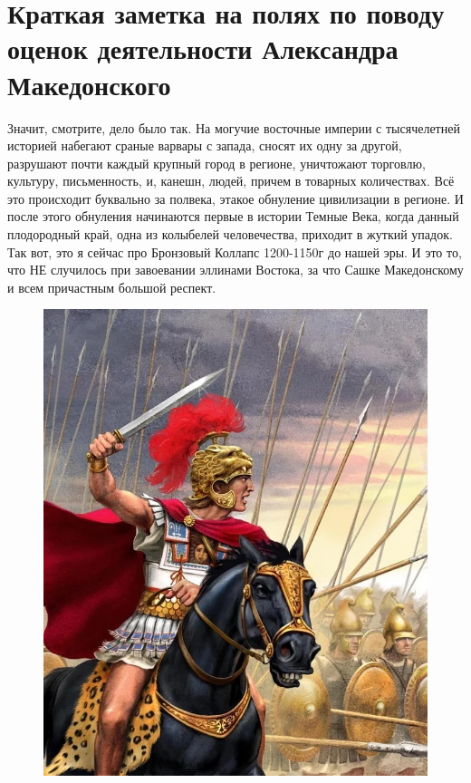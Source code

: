 \chapter{Краткая заметка на полях по поводу оценок деятельности Александра Македонского}


Значит, смотрите, дело было так. На могучие восточные империи с тысячелетней историей набегают сраные варвары с запада, сносят их одну за другой, разрушают почти каждый крупный город в регионе, уничтожают торговлю, культуру, письменность, и, канешн, людей, причем в товарных количествах. Всё это происходит буквально за полвека, этакое обнуление цивилизации в регионе. И после этого обнуления начинаются первые в истории Темные Века, когда данный плодородный край, одна из колыбелей человечества, приходит в жуткий упадок. Так вот, это я сейчас про Бронзовый Коллапс 1200-1150г до нашей эры. И это то, что НЕ случилось при завоевании эллинами Востока, за что Сашке Македонскому и всем причастным большой респект. 

\begin{figure}[h!tb] 
	\centering\includegraphics[scale=0.3]{MakedoskiyShort/160153850519581328.png}
\end{figure}



